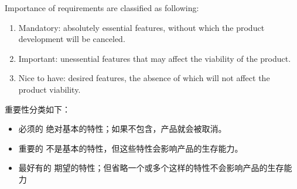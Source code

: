 Importance of requirements are classified as following:
\begin{enumerate}
\item Mandatory: absolutely essential features, without which the product development will be canceled.
\item Important: unessential features that may affect the viability of the product.
\item Nice to have: desired features, the absence of which will not affect the product viability.
\end{enumerate}

重要性分类如下：
\begin{itemize}
\item 必须的		绝对基本的特性；如果不包含，产品就会被取消。
\item 重要的		不是基本的特性，但这些特性会影响产品的生存能力。
\item 最好有的		期望的特性；但省略一个或多个这样的特性不会影响产品的生存能力
\end{itemize}
